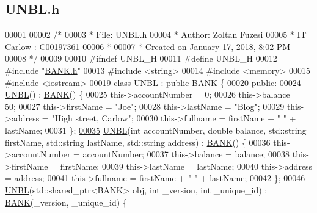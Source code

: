 \hypertarget{_u_n_b_l_8h_source}{}\subsection{U\+N\+B\+L.\+h}

\begin{DoxyCode}
00001 
00002 \textcolor{comment}{/* }
00003 \textcolor{comment}{ * File:   UNBL.h}
00004 \textcolor{comment}{ * Author: Zoltan Fuzesi}
00005 \textcolor{comment}{ * IT Carlow : C00197361}
00006 \textcolor{comment}{ *}
00007 \textcolor{comment}{ * Created on January 17, 2018, 8:02 PM}
00008 \textcolor{comment}{ */}
00009 
00010 \textcolor{preprocessor}{#ifndef UNBL\_H}
00011 \textcolor{preprocessor}{#define UNBL\_H}
00012 \textcolor{preprocessor}{#include "\hyperlink{_b_a_n_k_8h}{BANK.h}"}
00013 \textcolor{preprocessor}{#include <string>}
00014 \textcolor{preprocessor}{#include <memory>}
00015 \textcolor{preprocessor}{#include <iostream>}
\hypertarget{_u_n_b_l_8h_source.tex_l00019}{}\hyperlink{class_u_n_b_l}{00019} \textcolor{keyword}{class }\hyperlink{class_u_n_b_l}{UNBL} : \textcolor{keyword}{public} \hyperlink{class_b_a_n_k}{BANK} \{
00020 \textcolor{keyword}{public}:
\hypertarget{_u_n_b_l_8h_source.tex_l00024}{}\hyperlink{class_u_n_b_l_aa264ef64c453e6049b3d4c984d84d1de}{00024}     \hyperlink{class_u_n_b_l_aa264ef64c453e6049b3d4c984d84d1de}{UNBL}() : \hyperlink{class_b_a_n_k}{BANK}() \{
00025         this->accountNumber = 0;
00026         this->balance = 50;
00027         this->firstName = \textcolor{stringliteral}{"Joe"};
00028         this->lastName = \textcolor{stringliteral}{"Blog"};
00029         this->address = \textcolor{stringliteral}{"High street, Carlow"};
00030         this->fullname = firstName + \textcolor{stringliteral}{" "} + lastName;
00031     \};
\hypertarget{_u_n_b_l_8h_source.tex_l00035}{}\hyperlink{class_u_n_b_l_a9afc7728e8d9970b63592af018a2afb8}{00035}     \hyperlink{class_u_n_b_l_a9afc7728e8d9970b63592af018a2afb8}{UNBL}(\textcolor{keywordtype}{int} accountNumber, \textcolor{keywordtype}{double} balance, std::string firstName, std::string lastName, std::string 
      address) : \hyperlink{class_b_a_n_k}{BANK}() \{
00036         this->accountNumber = accountNumber;
00037         this->balance = balance;
00038         this->firstName = firstName;
00039         this->lastName = lastName;
00040         this->address = address;
00041         this->fullname = firstName + \textcolor{stringliteral}{" "} + lastName;
00042     \};
\hypertarget{_u_n_b_l_8h_source.tex_l00046}{}\hyperlink{class_u_n_b_l_abbd578fbd58cf6f2143f17b3011f6c21}{00046}     \hyperlink{class_u_n_b_l_abbd578fbd58cf6f2143f17b3011f6c21}{UNBL}(std::shared\_ptr<BANK> obj, \textcolor{keywordtype}{int} \_version, \textcolor{keywordtype}{int} \_unique\_id) : \hyperlink{class_b_a_n_k}{BANK}(\_version, \_unique\_id) \{

\end{DoxyCode}
